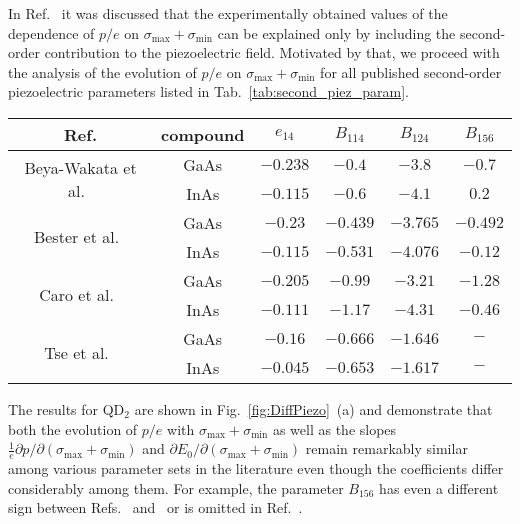In Ref.~\cite{Aberl:17} it was discussed that the experimentally obtained values of the dependence of $p/e$ on $\sigma_{\mathrm{max}}+\sigma_{\mathrm{min}}$ can be explained only by including the second-order contribution to the piezoelectric field.
%
Motivated by that, we proceed with the analysis of the evolution of $p/e$ on $\sigma_{\mathrm{max}}+\sigma_{\mathrm{min}}$ for all published second-order piezoelectric parameters listed in Tab.~\ref{tab:second_piez_param}. 
%
%
\begin{table*}[!ht]
	\begin{center}
		\caption{Values for the linear and quadratic piezoelectric coefficients $e_{14}$, $B_{114}$, $B_{124}$ and $B_{156}$. The references from which the parameters were taken are identified in the first column. The units of presented piezoelectric constants are $C/m^2$. For In$_x$Ga$_{1-x}$As, the constants were obtained by linear interpolation.
		\label{tab:second_piez_param}	
		}
		\begin{tabular}{c|ccccc}
			\hline \hline
			Ref. & compound & $e_{14}$ & $B_{114}$  & $B_{124}$ &$B_{156}$\\
			\hline
			\multirow{2}{*}{Beya-Wakata et al.~\cite{Beya-Wakata2011}} & GaAs & $-0.238$ & $-0.4$  & $-3.8$& $-0.7$\\
			& InAs& $-0.115$ & $-0.6$  & $-4.1$& $0.2$\\
			\hline
			\multirow{2}{*}{Bester et al.~\cite{Bester:06} }& GaAs & $-0.23$ & $-0.439$  & $-3.765$& $-0.492$\\
			& InAs& $-0.115$ & $-0.531$  & $-4.076$& $-0.12$\\
			\hline
			\multirow{2}{*}{Caro et al.~\cite{Caro2015}} & GaAs & $-0.205$ & $-0.99$  & $-3.21$& $-1.28$\\
			& InAs& $-0.111$ & $-1.17$  & $-4.31$& $-0.46$\\
			\hline
			\multirow{2}{*}{Tse et al.~\cite{Tse2013}} & GaAs & $-0.16$ & $-0.666$  & $-1.646$& $-$\\
			& InAs& $-0.045$ & $-0.653$  & $-1.617$& $-$\\
			\hline \hline
		\end{tabular}
	\end{center}
\end{table*}
%
%
The results for QD$_2$ are shown in Fig.~\ref{fig:DiffPiezo}~(a) and demonstrate that both the evolution of $p/e$ with $\sigma_{\mathrm{max}}+\sigma_{\mathrm{min}}$ as well as the slopes $\frac{1}{e}\partial p/\partial(\sigma_{\mathrm{max}}+\sigma_{\mathrm{min}})$ and $\partial E_0/\partial(\sigma_{\mathrm{max}}+\sigma_{\mathrm{min}})$ remain remarkably similar among various parameter sets in the literature even though the coefficients differ considerably among them.
For example, the parameter $B_{156}$ has even a different sign between Refs.~\cite{Bester:06} and~\cite{Beya-Wakata2011} or is omitted in Ref.~\cite{Tse2013}.
%


